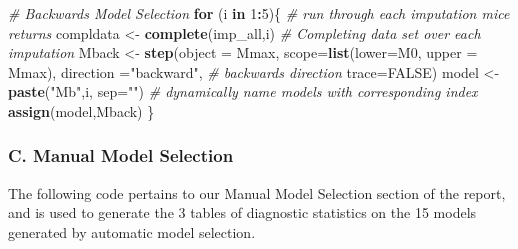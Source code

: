 \documentclass[]{article}
\newenvironment{Shaded}{\begin{snugshade}}{\end{snugshade}}
\newcommand{\KeywordTok}[1]{\textcolor[rgb]{0.13,0.29,0.53}{\textbf{#1}}}
\newcommand{\DataTypeTok}[1]{\textcolor[rgb]{0.13,0.29,0.53}{#1}}
\newcommand{\DecValTok}[1]{\textcolor[rgb]{0.00,0.00,0.81}{#1}}
\newcommand{\StringTok}[1]{\textcolor[rgb]{0.31,0.60,0.02}{#1}}
\newcommand{\CommentTok}[1]{\textcolor[rgb]{0.56,0.35,0.01}{\textit{#1}}}
\newcommand{\OtherTok}[1]{\textcolor[rgb]{0.56,0.35,0.01}{#1}}
\newcommand{\ControlFlowTok}[1]{\textcolor[rgb]{0.13,0.29,0.53}{\textbf{#1}}}
\newcommand{\OperatorTok}[1]{\textcolor[rgb]{0.81,0.36,0.00}{\textbf{#1}}}
\newcommand{\NormalTok}[1]{#1}
\begin{document}
\begin{Shaded}
\begin{Highlighting}[]
\CommentTok{# Backwards Model Selection}
\ControlFlowTok{for}\NormalTok{ (i }\ControlFlowTok{in} \DecValTok{1}\OperatorTok{:}\DecValTok{5}\NormalTok{)\{ }\CommentTok{# run through each imputation mice returns}
\NormalTok{  compldata <-}\StringTok{ }\KeywordTok{complete}\NormalTok{(imp_all,i) }\CommentTok{# Completing data set over each imputation}
\NormalTok{  Mback <-}\StringTok{ }\KeywordTok{step}\NormalTok{(}\DataTypeTok{object =}\NormalTok{ Mmax,}
              \DataTypeTok{scope=}\KeywordTok{list}\NormalTok{(}\DataTypeTok{lower=}\NormalTok{M0, }\DataTypeTok{upper =}\NormalTok{ Mmax),}
              \DataTypeTok{direction =}\StringTok{"backward"}\NormalTok{, }\CommentTok{# backwards direction }
              \DataTypeTok{trace=}\OtherTok{FALSE}\NormalTok{)}
\NormalTok{  model <-}\StringTok{ }\KeywordTok{paste}\NormalTok{(}\StringTok{"Mb"}\NormalTok{,i, }\DataTypeTok{sep=}\StringTok{""}\NormalTok{) }\CommentTok{# dynamically name models with corresponding index}
  \KeywordTok{assign}\NormalTok{(model,Mback)}
\NormalTok{\}}
\end{Highlighting}
\end{Shaded}

\subsubsection{C. Manual Model
Selection}\label{c.-manual-model-selection}

The following code pertains to our Manual Model Selection section of the
report, and is used to generate the 3 tables of diagnostic statistics on
the 15 models generated by automatic model selection.
\end{document}
